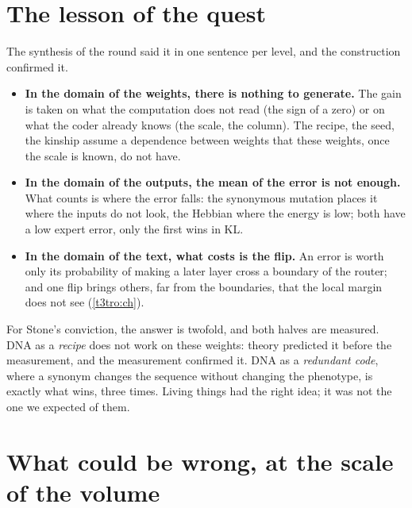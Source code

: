 \section{The lesson of the quest}\label{t3dis:sec:lecon}

The synthesis of the round said it in one sentence per level, and the construction confirmed it.
\begin{itemize}
\item \textbf{In the domain of the weights, there is nothing to generate.} The gain is taken on what the computation does not read (the sign of a zero) or on what the coder already knows (the scale, the column). The recipe, the seed, the kinship assume a dependence between weights that these weights, once the scale is known, do not have.
\item \textbf{In the domain of the outputs, the mean of the error is not enough.} What counts is where the error falls: the synonymous mutation places it where the inputs do not look, the Hebbian where the energy is low; both have a low expert error, only the first wins in KL.
\item \textbf{In the domain of the text, what costs is the flip.} An error is worth only its probability of making a later layer cross a boundary of the router; and one flip brings others, far from the boundaries, that the local margin does not see (\cref{t3tro:ch}).
\end{itemize}
For Stone's conviction, the answer is twofold, and both halves are measured. DNA as a \emph{recipe} does not work on these weights: theory predicted it before the measurement, and the measurement confirmed it. DNA as a \emph{redundant code}, where a synonym changes the sequence without changing the phenotype, is exactly what wins, three times. Living things had the right idea; it was not the one we expected of them.

\section{What could be wrong, at the scale of the volume}\label{t3dis:sec:faux}

